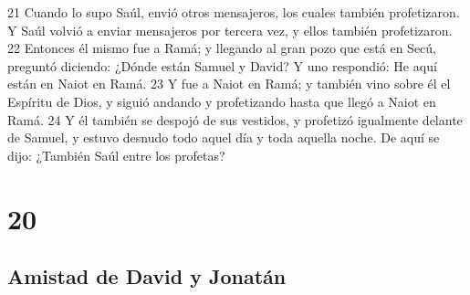 21 Cuando lo supo Saúl, envió otros mensajeros, los cuales también profetizaron. Y Saúl volvió a enviar mensajeros por tercera vez, y ellos también profetizaron.
22 Entonces él mismo fue a Ramá; y llegando al gran pozo que está en Secú, preguntó diciendo: ¿Dónde están Samuel y David? Y uno respondió: He aquí están en Naiot en Ramá.
23 Y fue a Naiot en Ramá; y también vino sobre él el Espíritu de Dios, y siguió andando y profetizando hasta que llegó a Naiot en Ramá.
24 Y él también se despojó de sus vestidos, y profetizó igualmente delante de Samuel, y estuvo desnudo todo aquel día y toda aquella noche. De aquí se dijo: ¿También Saúl entre los profetas? 

\chapter{20}

\section*{Amistad de David y Jonatán}


